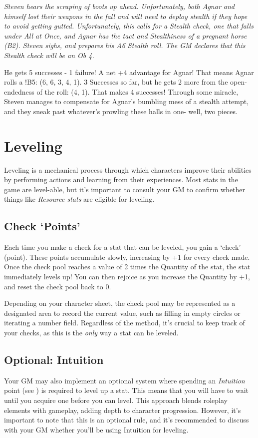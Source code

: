 \documentclass[../main.tex]{subfiles}
\begin{document}
        \begin{displayquote}
            {\em Steven hears the scraping of boots up ahead. Unfortunately, both Agnar and himself lost their weapons in the fall and will need to deploy stealth if they hope to avoid getting gutted. Unfortunately, this calls for a Stealth check, one that falls under All at Once, and Agnar has the tact and Stealthiness of a pregnant horse (B2). Steven sighs, and prepares his A6 Stealth roll. The GM declares that this Stealth check will be an Ob 4.
        
            He gets 5 successes - 1 failure! A net +4 advantage for Agnar! That means Agnar rolls a !B5: (6, 6, 3, 4, 1). 3 Successes so far, but he gets 2 more from the open-endedness of the roll: (4, 1). That makes 4 successes! Through some miracle, Steven manages to compensate for Agnar's bumbling mess of a stealth attempt, and they sneak past whatever's prowling these halls in one- well, two pieces.}
    \end{displayquote}

    \section{Leveling}

    Leveling is a mechanical process through which characters improve their abilities by performing actions and learning from their experiences. Most stats in the game are level-able, but it's important to consult your GM to confirm whether things like \emph{Resource stats} are eligible for leveling.

    \subsection{Check `Points'}

    Each time you make a check for a stat that can be leveled, you gain a `check' (point). These points accumulate slowly, increasing by +1 for every check made. Once the check pool reaches a value of 2 times the Quantity of the stat, the stat immediately levels up! You can then rejoice as you increase the Quantity by +1, and reset the check pool back to 0.

    Depending on your character sheet, the check pool may be represented as a designated area to record the current value, such as filling in empty circles or iterating a number field. Regardless of the method, it's crucial to keep track of your checks, as this is the \emph{only} way a stat can be leveled.

    \subsection{Optional: Intuition}
    
    Your GM may also implement an optional system where spending an \emph{Intuition} point (see {}) is required to level up a stat. This means that you will have to wait until you acquire one before you can level. This approach blends roleplay elements with gameplay, adding depth to character progression. However, it's important to note that this is an optional rule, and it's recommended to discuss with your GM whether you'll be using Intuition for leveling.
\end{document}
